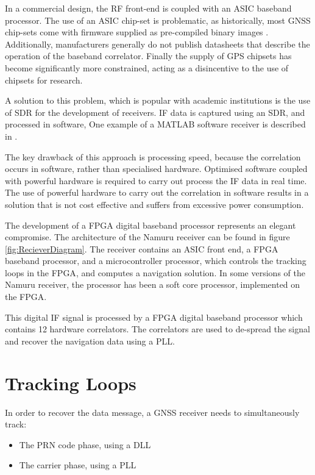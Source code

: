 In a commercial design, the RF front-end is coupled with an \ac{ASIC} baseband processor. The use of an \ac{ASIC} chip-set is problematic, as historically, most \ac{GNSS} chip-sets come with firmware supplied as pre-compiled binary images \cite{Glennon11aquariusfirmware}. 
Additionally, manufacturers generally do not publish datasheets that describe the operation of the baseband correlator\cite{Glennon11aquariusfirmware}. Finally the supply of GPS chipsets has become significantly more constrained, acting as a disincentive to the use of chipsets for research.

A solution to this problem, which is popular with academic institutions is the use of \ac{SDR} for the development of receivers. \ac{IF} data is captured using an \ac{SDR}, and processed in software\cite{Glennon11aquariusfirmware}, One example of a MATLAB software receiver is described in \cite{KaiBorre}.

The key drawback of this approach is processing speed, because the correlation occurs in software, rather than specialised hardware. Optimised software coupled with powerful hardware is required to carry out process the \ac{IF} data in real time. The use of powerful hardware to carry out the correlation in software results in a solution that is not cost effective and suffers from excessive power consumption.

The development of a \ac{FPGA} digital baseband processor represents an elegant compromise. 
The architecture of the Namuru receiver can be found in figure \ref{fig:RecieverDiagram}. The receiver contains an \ac{ASIC} front end, a \ac{FPGA} baseband processor, and a microcontroller processor, which controls the tracking loops in the \ac{FPGA}, and computes a navigation solution. In some versions of the Namuru receiver, the processor has been a soft core processor, implemented on the \ac{FPGA}.

This digital \ac{IF} signal is processed by a \ac{FPGA} digital baseband processor which contains 12 hardware correlators. The correlators are used to de-spread the signal and recover the navigation data using a \ac{PLL}.

\section{Tracking Loops}
In order to recover the data message, a \ac{GNSS} receiver needs to simultaneously track:

\begin{itemize}
\item{The \ac{PRN} code phase, using a \ac{DLL}} 
\item{The carrier phase, using a \ac{PLL}}
\end{itemize}

